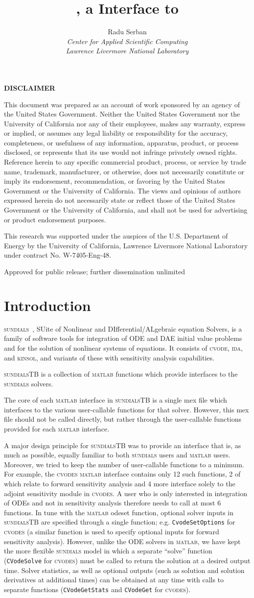 \documentclass[titlepage,10pt]{article}
\title{{\sundialsTB}, a {\matlab} Interface to {\sundials}}
\author{
  Radu Serban \\ 
  {\em Center for Applied Scientific Computing} \\ 
  {\em Lawrence Livermore National Laboratory}
}
\date{
  \STBdate 
  \vfill 
  {\centerline{\psfig{figure=doc_logo.eps,width=0.5\textwidth}}}
  \vfill \STBucrl}
\newcommand{\disclaimer}{%
\changetext{.625in}{}{}{}{}
\thispagestyle{empty}%
\vglue5\baselineskip
\begin{center}
{\bf DISCLAIMER}
\end{center}
\noindent
This document was prepared as an account of work sponsored by an agency of the
United States Government.  Neither the United States Government nor the University
of California nor any of their employees, makes any warranty, express or implied,
or assumes any legal liability or responsibility for the accuracy, completeness,
or usefulness of any information, apparatus, product, or process disclosed, or
represents that its use would not infringe privately owned rights. Reference
herein to any specific commercial product, process, or service by trade name,
trademark, manufacturer, or otherwise, does not necessarily constitute or imply
its endorsement, recommendation, or favoring by the United States Government
or the University of California.  The views and opinions of authors expressed
herein do not necessarily state or reflect those of the United States Government
or the University of California, and shall not be used for advertising or
product endorsement purposes.

\vskip2\baselineskip
This research was supported under the auspices of the U.S. Department of Energy by
the University of California, Lawrence Livermore National Laboratory under
contract No.  W-7405-Eng-48.
\vfill
\begin{center}
Approved for public release; further dissemination unlimited
\end{center}
\clearpage
\changetext{-.625in}{}{}{}{}
}
\newcommand{\clearemptydoublepage}{\newpage{\pagestyle{empty}\cleardoublepage}}
\newcommand{\sundialsTB}{{\normalfont\scshape sundialsTB}}
\newcommand{\sundials}{{\normalfont\scshape sundials}}
\newcommand{\cvode}{{\normalfont\scshape cvode}}
\newcommand{\cvodes}{{\normalfont\scshape cvodes}}
\newcommand{\ida}{{\normalfont\scshape ida}}
\newcommand{\kinsol}{{\normalfont\scshape kinsol}}
\newcommand{\matlab}{{\normalfont\scshape matlab}}
\begin{document}
\pagestyle{empty}
\maketitle
\disclaimer

\tableofcontents

\clearemptydoublepage

\pagestyle{plain}

\section{Introduction}

{\sundials}~\cite{HBGLSSW:04}, SUite of Nonlinear and DIfferential/ALgebraic equation Solvers,
is a family of software tools for integration of ODE and DAE initial value problems
and for the solution of nonlinear systems of equations.
It consists of {\cvode}, {\ida}, and {\kinsol}, and variants of these with 
sensitivity analysis capabilities.

{\sundialsTB} is a collection of {\matlab} functions which provide interfaces to
the {\sundials} solvers.

The core of each {\matlab} interface in {\sundialsTB} is a single {\sc mex} 
file which interfaces to the various user-callable functions for that solver.
However, this {\sc mex} file should not be called directly, but rather through the 
user-callable functions provided for each {\matlab} interface.

A major design principle for {\sundialsTB}
was to provide an interface that is, as much as possible, equally familiar to
both {\sundials} users and {\matlab} users. Moreover, we tried to keep the
number of user-callable functions to a minimum. For example, the {\cvodes} {\matlab} 
interface contains only 12 such functions, 2 of which relate to forward sensitivity analysis and
4 more interface solely to the adjoint sensitivity module in {\cvodes}. 
A user who is only interested in integration of ODEs and not in sensitivity analysis
therefore needs to call at most 6 functions.
In tune with the {\matlab} {\sc odeset} function, optional
solver inputs in {\sundialsTB} are specified through a single function; e.g.
{\tt CvodeSetOptions} for {\cvodes} (a similar function is used to specify optional
inputs for forward sensitivity analysis). However, unlike the ODE solvers in {\matlab}, we
have kept the more flexible {\sundials} model in which a separate ``solve'' function 
({\tt CVodeSolve} for {\cvodes}) must be called to return the solution at a desired 
output time. Solver statistics, as well as optional outputs (such as
solution and solution derivatives at additional times) can be obtained at any time
with calls to separate functions ({\tt CVodeGetStats} and {\tt CVodeGet} for {\cvodes}).
\end{document}
